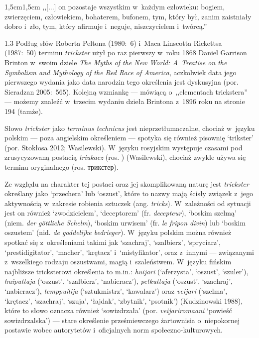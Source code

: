 \documentclass[11pt,a4paper,twoside]{report}
\begin{document}
\begin{adjustwidth}{1,5cm}{1,5cm}
\small{
,,[...] on pozostaje wszystkim w~każdym człowieku: bogiem, zwierzęciem, człowiekiem, bohaterem, bufonem, tym, który był, zanim zaistniały dobro i~zło, tym, który afirmuje i~neguje, niszczycielem i~twórcą.''\\
}
\end{adjustwidth}
\pagebreak
\vspace*{1\baselineskip}
\begin{spacing}{1.3}
Podług słów Roberta Peltona (1980:~6) i~Maca Linscotta Rickettsa (1987:~50) terminu \emph{trickster} użył po raz pierwszy w~roku 1868 Daniel Garrison Brinton w~swoim dziele \emph{The Myths of the New World: A~Treatise on the Symbolism and Mythology of the Red Race of America}, aczkolwiek data jego pierwszego wydania jako data narodzin tego określenia jest dyskusyjna (por. Sieradzan 2005:~565). Kolejną wzmiankę --- mówiącą o~,,elementach trickstera'' --- możemy znaleźć w~trzecim wydaniu dzieła Brintona z~1896 roku na stronie 194 (tamże).

Słowo \emph{trickster} jako \emph{terminus technicus} jest nieprzetłumaczalne, chociaż w~języku polskim --- poza angielskim określeniem --- spotyka się również pisownię `trikster' (por. Stokłosa 2012; Wasilewski). W~języku rosyjskim występuje czasami pod zrusycyzowaną postacią \emph{triukacz} (ros. {}) (Wasilewski), chociaż zwykle używa się terminu oryginalnego (ros. \foreignlanguage{russian}{\large трикстер}). %


Ze względu na charakter tej postaci oraz jej skomplikowaną naturę jest \emph{trickster} określany jako ‘przechera’ lub ‘oszust’, które to nazwy mają ścisły związek z~jego aktywnością w~zakresie robienia sztuczek (ang. \emph{tricks}). W~zależności od sytuacji jest on również ‘zwodzicielem’, ‘deceptorem’ (fr. \emph{decepteur}), ‘boskim szelmą’ (niem. \emph{der göttliche Schelm}), ‘boskim urwisem’ (fr. \emph{le fripon divin}) lub ‘boskim oszustem’ (nid. \emph{de goddelijke bedrieger}). W~języku polskim można również spotkać się z~określeniami takimi jak ‘szachraj’, ‘szalbierz’, ‘spryciarz’, `prestidigitator', ‘macher’, ‘krętacz’ i~‘mistyfikator’, oraz z~innymi --- związanymi z~wszelkiego rodzaju oszustwami, magią i~szaleństwem. W~języku fińskim najbliższe tricksterowi określenia to m.in.: \emph{huijari} (‘aferzysta’, ‘oszust’, ‘szuler’), \emph{huiputtaja} (‘oszust’, ‘szalbierz’, ‘nabieracz’), \emph{petkuttaja} (‘oszust’, ‘szachraj’, ‘nabieracz’), \emph{temppuilija} (‘sztukmistrz’, ‘kawalarz’) oraz \emph{veijari} (‘szelma’, ‘krętacz’, ‘szachraj’, ‘szuja’, ‘łajdak’, ‘zbytnik’, ‘psotnik’) (Kudzinowski 1988), które to słowo oznacza również ‘sowizdrzała’ (por. \emph{veijariromaani} ‘powieść sowizdrzalska’) --- stare określenie prześmiewczego żartownisia o~niepokornej postawie wobec autorytetów i~oficjalnych norm społeczno-kulturowych.
\end{spacing}
\end{document}
